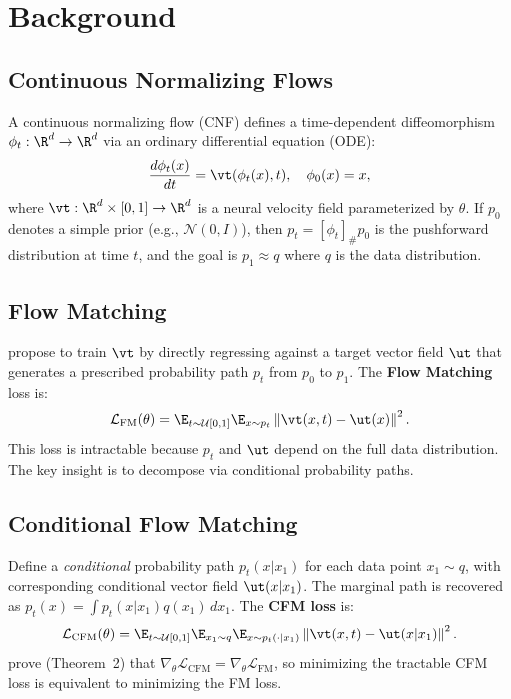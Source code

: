 \section{Background}
\label{sec:background}

\subsection{Continuous Normalizing Flows}

A continuous normalizing flow (CNF) defines a time-dependent diffeomorphism $\phi_t : \R^d \to \R^d$ via an ordinary differential equation (ODE):
\begin{equation}
    \frac{d\phi_t(x)}{dt} = \vt(\phi_t(x), t), \quad \phi_0(x) = x,
    \label{eq:cnf}
\end{equation}
where $\vt : \R^d \times [0,1] \to \R^d$ is a neural velocity field parameterized by $\theta$. If $p_0$ denotes a simple prior (e.g., $\mathcal{N}(0, I)$), then $p_t = [\phi_t]_\# p_0$ is the pushforward distribution at time $t$, and the goal is $p_1 \approx q$ where $q$ is the data distribution.

\subsection{Flow Matching}

\citet{lipman2023flow} propose to train $\vt$ by directly regressing against a target vector field $\ut$ that generates a prescribed probability path $p_t$ from $p_0$ to $p_1$. The \textbf{Flow Matching} loss is:
\begin{equation}
    \mathcal{L}_{\text{FM}}(\theta) = \E_{t \sim \mathcal{U}[0,1]} \E_{x \sim p_t} \left\| \vt(x, t) - \ut(x) \right\|^2.
    \label{eq:fm_loss}
\end{equation}
This loss is intractable because $p_t$ and $\ut$ depend on the full data distribution. The key insight is to decompose via conditional probability paths.

\subsection{Conditional Flow Matching}

Define a \emph{conditional} probability path $p_t(x | x_1)$ for each data point $x_1 \sim q$, with corresponding conditional vector field $\ut(x | x_1)$. The marginal path is recovered as $p_t(x) = \int p_t(x | x_1) q(x_1) \, dx_1$. The \textbf{CFM loss} is:
\begin{equation}
    \mathcal{L}_{\text{CFM}}(\theta) = \E_{t \sim \mathcal{U}[0,1]} \E_{x_1 \sim q} \E_{x \sim p_t(\cdot | x_1)} \left\| \vt(x, t) - \ut(x | x_1) \right\|^2.
    \label{eq:cfm_loss}
\end{equation}
\citet{lipman2023flow} prove (Theorem~2) that $\nabla_\theta \mathcal{L}_{\text{CFM}} = \nabla_\theta \mathcal{L}_{\text{FM}}$, so minimizing the tractable CFM loss is equivalent to minimizing the FM loss.

